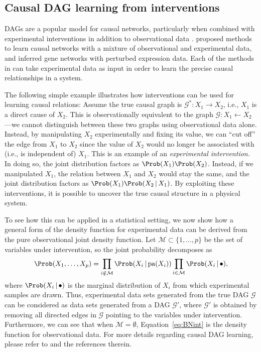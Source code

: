 \documentclass[article]{jss}
\renewcommand{\|}{\,|\,}
\begin{document}
\subsection{Causal DAG learning from interventions}
\label{subsec:causal}

DAGs are a popular model for causal networks, particularly when combined with experimental interventions in addition to observational data \citep{Pearl00}. \citet{cooper1999causal,meganck2006learning,Ellis08} proposed methods to learn causal networks with a mixture of observational and experimental data, and \citet{pe2001inferring,pournara2004reconstruction} inferred gene networks with perturbed expression data.
Each of the methods in  can take experimental data as input in order to learn the precise causal relationships in a system.

The following simple example illustrates how interventions can be used for learning causal relations: Assume the true causal graph is $\mathcal{G}^*: X_1 \rightarrow X_2$, i.e., $X_{1}$ is a direct cause of $X_{2}$. This is observationally equivalent to the graph $\mathcal{G}: X_1 \leftarrow X_2$---we cannot distinguish between these two graphs using observational data alone. Instead, by manipulating $X_2$ experimentally and fixing its value, we can ``cut off'' the edge from $X_1$ to $X_2$ since the value of $X_{2}$ would no longer be associated with (i.e., is independent of) $X_{1}$. This is an example of an \emph{experimental intervention.} In doing so, the joint distribution factors as $\Prob(X_1)\Prob(X_2)$. Instead, if we manipulated $X_1$, the relation between $X_1$ and $X_2$ would stay the same, and the joint distribution factors as $\Prob(X_1)\Prob(X_2\|X_{1})$. By exploiting these interventions, it is possible to uncover the true causal structure in a physical system.

To see how this can be applied in a statistical setting, we now show how a general form of the density function for experimental data can be derived from the pure observational joint density function. Let $\mathcal{M} \subset\{1,\ldots,p\}$ be the set of variables under intervention, so the joint probability decomposes as
\begin{equation}\label{eq:BNint}
\Prob(X_1,\ldots,X_p)=\prod_{i \notin \mathcal{M}}\Prob(X_i\|\text{pa}(X_i))\prod_{i \in \mathcal{M}}\Prob(X_i\|\bullet),
\end{equation}
where $\Prob(X_i\|\bullet)$ is the marginal distribution of $X_i$ from which experimental samples are drawn. 
Thus, experimental data sets generated from
the true DAG $\mathcal{G}$ can be considered as data sets generated
from a DAG $\mathcal{G'}$, where $\mathcal{G'}$ is obtained by removing all directed edges in $\mathcal{G}$
pointing to the variables under intervention.
Furthermore, we can see that when $\mathcal{M} = \emptyset$,  Equation~\ref{eq:BNint} is the density function for observational data. For more details regarding causal DAG learning, please refer to \citet{Pearl00} and the references therein.
\end{document}
